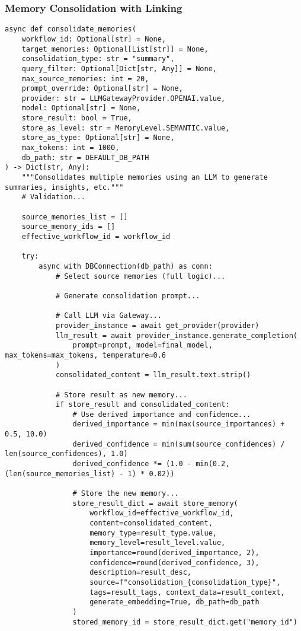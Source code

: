 \documentclass[12pt,a4paper]{article}
\begin{document}
\subsubsection*{Memory Consolidation with Linking}
\begin{pageablecode}
\begin{verbatim}
async def consolidate_memories(
    workflow_id: Optional[str] = None,
    target_memories: Optional[List[str]] = None,
    consolidation_type: str = "summary",
    query_filter: Optional[Dict[str, Any]] = None,
    max_source_memories: int = 20,
    prompt_override: Optional[str] = None,
    provider: str = LLMGatewayProvider.OPENAI.value,
    model: Optional[str] = None,
    store_result: bool = True,
    store_as_level: str = MemoryLevel.SEMANTIC.value,
    store_as_type: Optional[str] = None,
    max_tokens: int = 1000,
    db_path: str = DEFAULT_DB_PATH
) -> Dict[str, Any]:
    """Consolidates multiple memories using an LLM to generate summaries, insights, etc."""
    # Validation...

    source_memories_list = []
    source_memory_ids = []
    effective_workflow_id = workflow_id

    try:
        async with DBConnection(db_path) as conn:
            # Select source memories (full logic)...

            # Generate consolidation prompt...

            # Call LLM via Gateway...
            provider_instance = await get_provider(provider)
            llm_result = await provider_instance.generate_completion(
                prompt=prompt, model=final_model, max_tokens=max_tokens, temperature=0.6
            )
            consolidated_content = llm_result.text.strip()

            # Store result as new memory...
            if store_result and consolidated_content:
                # Use derived importance and confidence...
                derived_importance = min(max(source_importances) + 0.5, 10.0)
                derived_confidence = min(sum(source_confidences) / len(source_confidences), 1.0)
                derived_confidence *= (1.0 - min(0.2, (len(source_memories_list) - 1) * 0.02))

                # Store the new memory...
                store_result_dict = await store_memory(
                    workflow_id=effective_workflow_id,
                    content=consolidated_content,
                    memory_type=result_type.value,
                    memory_level=result_level.value,
                    importance=round(derived_importance, 2),
                    confidence=round(derived_confidence, 3),
                    description=result_desc,
                    source=f"consolidation_{consolidation_type}",
                    tags=result_tags, context_data=result_context,
                    generate_embedding=True, db_path=db_path
                )
                stored_memory_id = store_result_dict.get("memory_id")


\end{verbatim}
\end{pageablecode}
\end{document}
